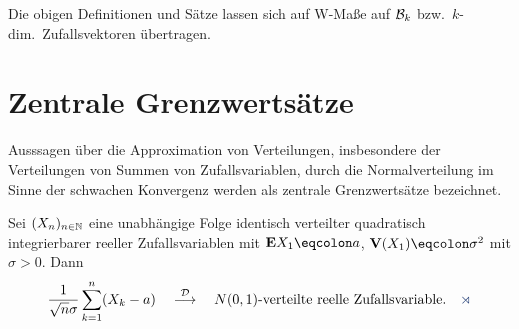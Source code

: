 \begin{bem}
\label{bem:9.2}
Die obigen Definitionen und Sätze lassen sich auf W-Maße auf ${\mathcal{B}}_{k}$
bzw.\ $k$-dim.\ Zufallsvektoren übertragen.\maphere
\end{bem}

\section{Zentrale Grenzwertsätze}

Ausssagen über die Approximation von Verteilungen, insbesondere der
Verteilungen von Summen von Zufallsvariablen, durch die Normalverteilung im
Sinne der schwachen Konvergenz werden als zentrale Grenzwertsätze bezeichnet.

\begin{prop}
\label{prop:9.11}
Sei $(X_{n})_{n\in \mathbb{N}}$ eine unabhängige Folge identisch verteilter quadratisch
integrierbarer reeller Zufallsvariablen mit $\E X_{1} \defr a$, $\V(X_{1})\defr\sigma
^ {2}$ mit $\sigma >0$. Dann
\begin{align*}
\frac{1}{\sqrt{n} \sigma } \sum\limits^{n}_{k=1} (X_{k}-a)\quad
\overset{\DD}{\longrightarrow}\quad N(0,1)\mbox{-verteilte reelle
Zufallsvariable.}\fishhere
\end{align*}
\end{prop}

